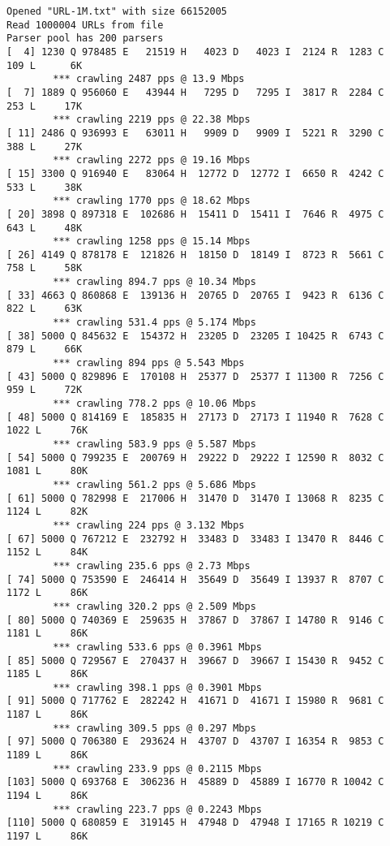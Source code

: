 \documentclass[11pt]{article}
\begin{document}
\begin{lstlisting}[label=app-trace,caption=Output of Homework 1]
Opened "URL-1M.txt" with size 66152005
Read 1000004 URLs from file
Parser pool has 200 parsers
[  4] 1230 Q 978485 E   21519 H   4023 D   4023 I  2124 R  1283 C   109 L      6K
        *** crawling 2487 pps @ 13.9 Mbps
[  7] 1889 Q 956060 E   43944 H   7295 D   7295 I  3817 R  2284 C   253 L     17K
        *** crawling 2219 pps @ 22.38 Mbps
[ 11] 2486 Q 936993 E   63011 H   9909 D   9909 I  5221 R  3290 C   388 L     27K
        *** crawling 2272 pps @ 19.16 Mbps
[ 15] 3300 Q 916940 E   83064 H  12772 D  12772 I  6650 R  4242 C   533 L     38K
        *** crawling 1770 pps @ 18.62 Mbps
[ 20] 3898 Q 897318 E  102686 H  15411 D  15411 I  7646 R  4975 C   643 L     48K
        *** crawling 1258 pps @ 15.14 Mbps
[ 26] 4149 Q 878178 E  121826 H  18150 D  18149 I  8723 R  5661 C   758 L     58K
        *** crawling 894.7 pps @ 10.34 Mbps
[ 33] 4663 Q 860868 E  139136 H  20765 D  20765 I  9423 R  6136 C   822 L     63K
        *** crawling 531.4 pps @ 5.174 Mbps
[ 38] 5000 Q 845632 E  154372 H  23205 D  23205 I 10425 R  6743 C   879 L     66K
        *** crawling 894 pps @ 5.543 Mbps
[ 43] 5000 Q 829896 E  170108 H  25377 D  25377 I 11300 R  7256 C   959 L     72K
        *** crawling 778.2 pps @ 10.06 Mbps
[ 48] 5000 Q 814169 E  185835 H  27173 D  27173 I 11940 R  7628 C  1022 L     76K
        *** crawling 583.9 pps @ 5.587 Mbps
[ 54] 5000 Q 799235 E  200769 H  29222 D  29222 I 12590 R  8032 C  1081 L     80K
        *** crawling 561.2 pps @ 5.686 Mbps
[ 61] 5000 Q 782998 E  217006 H  31470 D  31470 I 13068 R  8235 C  1124 L     82K
        *** crawling 224 pps @ 3.132 Mbps
[ 67] 5000 Q 767212 E  232792 H  33483 D  33483 I 13470 R  8446 C  1152 L     84K
        *** crawling 235.6 pps @ 2.73 Mbps
[ 74] 5000 Q 753590 E  246414 H  35649 D  35649 I 13937 R  8707 C  1172 L     86K
        *** crawling 320.2 pps @ 2.509 Mbps
[ 80] 5000 Q 740369 E  259635 H  37867 D  37867 I 14780 R  9146 C  1181 L     86K
        *** crawling 533.6 pps @ 0.3961 Mbps
[ 85] 5000 Q 729567 E  270437 H  39667 D  39667 I 15430 R  9452 C  1185 L     86K
        *** crawling 398.1 pps @ 0.3901 Mbps
[ 91] 5000 Q 717762 E  282242 H  41671 D  41671 I 15980 R  9681 C  1187 L     86K
        *** crawling 309.5 pps @ 0.297 Mbps
[ 97] 5000 Q 706380 E  293624 H  43707 D  43707 I 16354 R  9853 C  1189 L     86K
        *** crawling 233.9 pps @ 0.2115 Mbps
[103] 5000 Q 693768 E  306236 H  45889 D  45889 I 16770 R 10042 C  1194 L     86K
        *** crawling 223.7 pps @ 0.2243 Mbps
[110] 5000 Q 680859 E  319145 H  47948 D  47948 I 17165 R 10219 C  1197 L     86K

\end{lstlisting}
\end{document}

